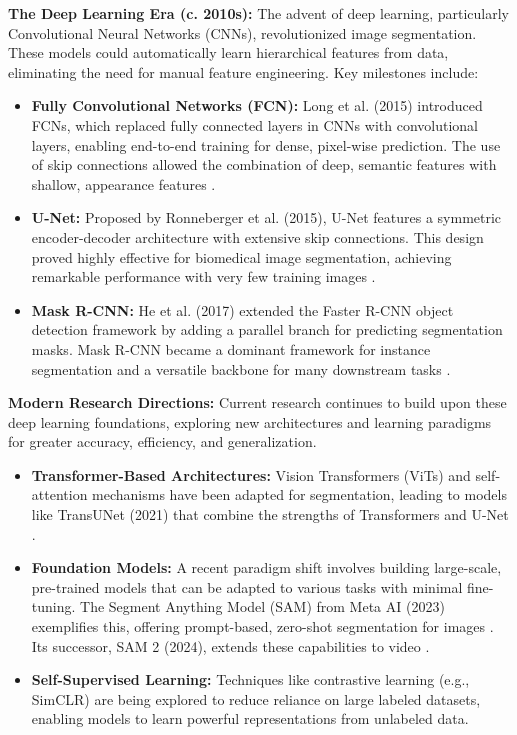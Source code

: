 \documentclass[conference]{IEEEtran}
\begin{document}
\textbf{The Deep Learning Era (c. 2010s):} The advent of deep learning, particularly Convolutional Neural Networks (CNNs), revolutionized image segmentation. These models could automatically learn hierarchical features from data, eliminating the need for manual feature engineering. Key milestones include:
\begin{itemize}
	\item \textbf{Fully Convolutional Networks (FCN):} Long et al. (2015) introduced FCNs, which replaced fully connected layers in CNNs with convolutional layers, enabling end-to-end training for dense, pixel-wise prediction. The use of skip connections allowed the combination of deep, semantic features with shallow, appearance features \cite{long2015fully}.
	\item \textbf{U-Net:} Proposed by Ronneberger et al. (2015), U-Net features a symmetric encoder-decoder architecture with extensive skip connections. This design proved highly effective for biomedical image segmentation, achieving remarkable performance with very few training images \cite{ronneberger2015u}.
	\item \textbf{Mask R-CNN:} He et al. (2017) extended the Faster R-CNN object detection framework by adding a parallel branch for predicting segmentation masks. Mask R-CNN became a dominant framework for instance segmentation and a versatile backbone for many downstream tasks \cite{he2017mask}.
\end{itemize}

\textbf{Modern Research Directions:} Current research continues to build upon these deep learning foundations, exploring new architectures and learning paradigms for greater accuracy, efficiency, and generalization.
\begin{itemize}
	\item \textbf{Transformer-Based Architectures:} Vision Transformers (ViTs) and self-attention mechanisms have been adapted for segmentation, leading to models like TransUNet (2021) that combine the strengths of Transformers and U-Net \cite{chen2021transunet}.
	\item \textbf{Foundation Models:} A recent paradigm shift involves building large-scale, pre-trained models that can be adapted to various tasks with minimal fine-tuning. The Segment Anything Model (SAM) from Meta AI (2023) exemplifies this, offering prompt-based, zero-shot segmentation for images \cite{kirillov2023segment}. Its successor, SAM 2 (2024), extends these capabilities to video \cite{ravi2024sam}.
	\item \textbf{Self-Supervised Learning:} Techniques like contrastive learning (e.g., SimCLR) are being explored to reduce reliance on large labeled datasets, enabling models to learn powerful representations from unlabeled data.
\end{itemize}
\end{document}
